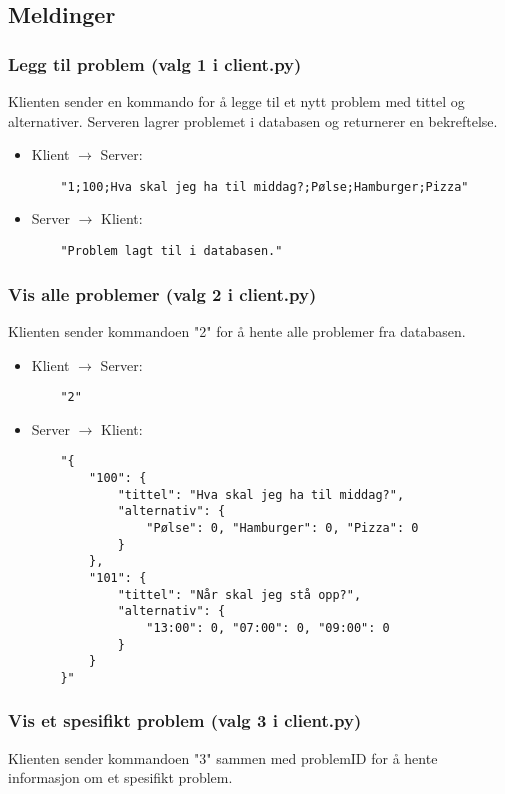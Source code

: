 \documentclass[hidelinks]{article}
\begin{document}
\subsection{Meldinger}

\subsubsection{Legg til problem (valg 1 i client.py)}
Klienten sender en kommando for å legge til et nytt problem med tittel og alternativer. Serveren lagrer problemet i databasen og returnerer en bekreftelse.

\begin{itemize}
    \item Klient \(\rightarrow\) Server:
    \begin{verbatim}
    "1;100;Hva skal jeg ha til middag?;Pølse;Hamburger;Pizza"
    \end{verbatim}
    \item Server \(\rightarrow\) Klient:
    \begin{verbatim}
    "Problem lagt til i databasen."
    \end{verbatim}
\end{itemize}

\subsubsection{Vis alle problemer (valg 2 i client.py)}
Klienten sender kommandoen "2" for å hente alle problemer fra databasen.

\begin{itemize}
    \item Klient \(\rightarrow\) Server:
    \begin{verbatim}
    "2"
    \end{verbatim}
    \item Server \(\rightarrow\) Klient:
    \begin{verbatim}
    "{
        "100": {
            "tittel": "Hva skal jeg ha til middag?",
            "alternativ": {
                "Pølse": 0, "Hamburger": 0, "Pizza": 0
            }
        },
        "101": {
            "tittel": "Når skal jeg stå opp?",
            "alternativ": {
                "13:00": 0, "07:00": 0, "09:00": 0
            }
        }
    }"
    \end{verbatim}
\end{itemize}

\subsubsection{Vis et spesifikt problem (valg 3 i client.py)}
Klienten sender kommandoen "3" sammen med problemID for å hente informasjon om et spesifikt problem.
\end{document}
